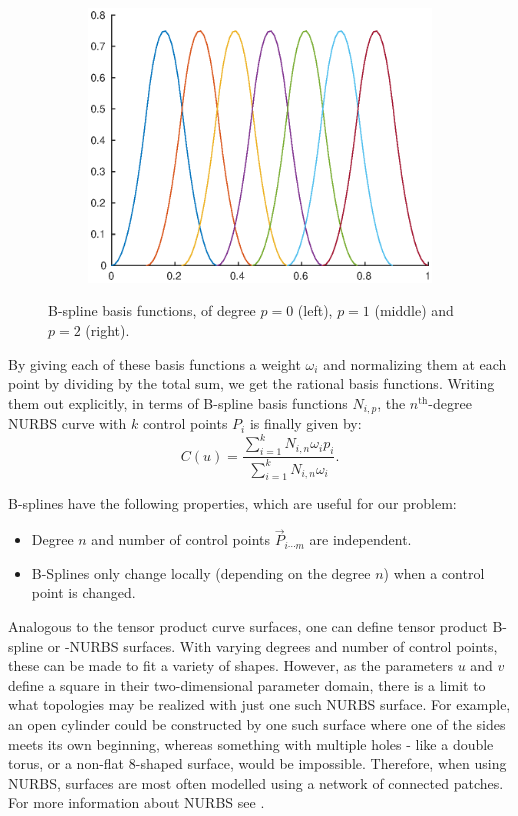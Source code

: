 \begin{figure}
\begin{subfigure}[b]{.3\linewidth}
  \includegraphics[width=\linewidth]{Pictures/basisquadratic}
  \label{fig:lognorm_quadratic}
\end{subfigure}
\caption{B-spline basis functions, of degree $p=0$ (left), $p=1$ (middle) and $p=2$ (right).}
\label{fig:bsplineBases}
\end{figure}


By giving each of these basis functions a weight $\omega_i$ and normalizing them at each point by dividing by the total sum, we get the rational basis functions. Writing them out explicitly, in terms of B-spline basis functions $N_{i,p}$, the $n^{\text{th}}$-degree NURBS curve with $k$ control points $P_i$ is finally given by:
\begin{equation}
C(u) = \frac{\sum_{i=1}^{k}N_{i,n}\omega_{i}p_{i}}{\sum_{i=1}^{k}N_{i,n}\omega_{i}}.
\end{equation}

B-splines have the following properties, which are useful for our problem:
\begin{itemize}
\item Degree $n$ and number of control points $\vec{P}_{i\cdots m}$ are independent.
\item B-Splines only change locally (depending on the degree $n$) when a control point is changed.
\end{itemize}

Analogous to the tensor product \Bez curve surfaces, one can define tensor product B-spline or -NURBS surfaces. With varying degrees and number of control points, these can be made to fit a variety of shapes. However, as the parameters $u$ and $v$ define a square in their two-dimensional parameter domain, there is a limit to what topologies may be realized with just one such NURBS surface. For example, an open cylinder could be constructed by one such surface where one of the sides meets its own beginning, whereas something with multiple holes - like a double torus, or a non-flat 8-shaped surface, would be impossible. Therefore, when using NURBS, surfaces are most often modelled using a network of connected patches.  For more information about NURBS see \cite{farin1999nurbs}.
